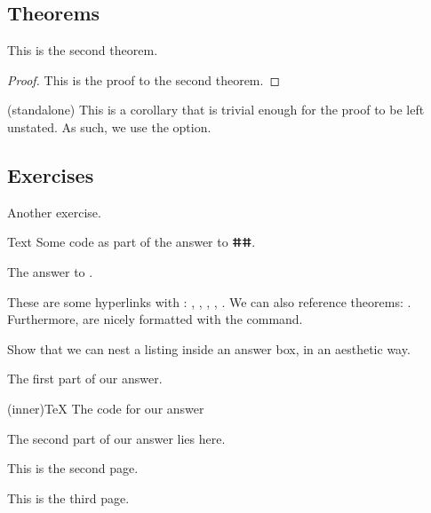 \subsection{Theorems}
\begin{theorem}
    This is the second theorem.
\end{theorem}
\begin{proof}
    This is the proof to the second theorem.
\end{proof}
\begin{corollary}(standalone)   
    This is a corollary that is trivial enough for the proof to be left unstated. As such, we use the  option.
\end{corollary}
\subsection{Exercises}
\begin{exercise}[label=ex:1.2]
    Another exercise.
\end{exercise}
\begin{code}{Text}
    Some code as part of the answer to ⵌⵌ.
\end{code}
\begin{answer}
    The answer to .
\end{answer}

These are some hyperlinks with : , , , , . We can also reference theorems: . Furthermore,  are nicely formatted with the  command.

\begin{exercise}
    Show that we can nest a listing inside an answer box, in an aesthetic way. 
\end{exercise}
\begin{answer}
    The first part of our answer.
    \begin{code}(inner){\TeX}
        The code for our answer
    \end{code}
    \hspace{-\parindent-4mm} The second part of our answer lies here.
\end{answer}
\newpage
This is the second page.

\newpage
This is the third page.